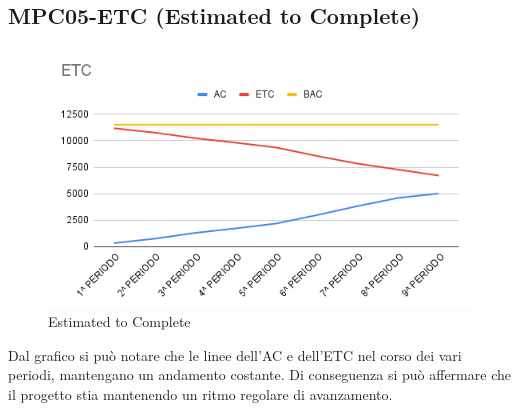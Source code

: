 \subsection{MPC05-ETC (Estimated to Complete)}
\begin{figure}[H]
  \centering
  \includegraphics[width=0.7\linewidth]{grafici/ETC.png}
  \caption{Estimated to Complete}
\end{figure}
Dal grafico si può notare che le linee dell'AC e dell'ETC nel corso dei vari periodi, mantengano un andamento costante. Di conseguenza si può affermare che il progetto stia mantenendo un ritmo regolare di avanzamento. 
